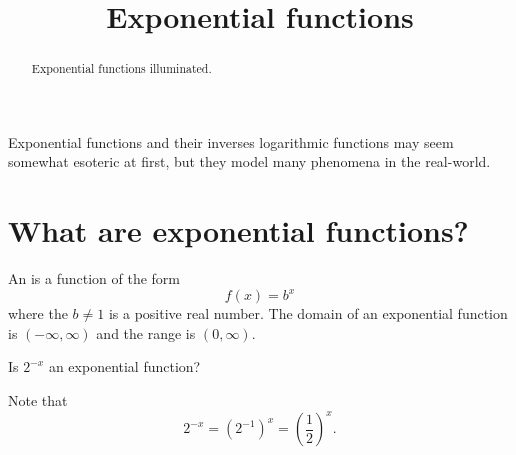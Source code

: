 \documentclass{ximera}
\title{Exponential functions}
\begin{document}
\begin{abstract}
  Exponential functions illuminated.
\end{abstract}
\maketitle

Exponential functions and their inverses logarithmic functions may seem somewhat esoteric at
first, but they model many phenomena in the real-world.




\section{What are exponential functions?}


\begin{definition}
  An  is a function of the form
  \[
  f(x) = b^x
  \]
  where the  $b\ne 1$ is a positive real number. The domain of an
  exponential function is $(-\infty,\infty)$ and the range is $(0, \infty)$.
\end{definition}

\begin{question}
  Is $2^{-x}$ an exponential function?
  \begin{multipleChoice}
  \end{multipleChoice}
  \begin{feedback}
    Note that
    \[
    2^{-x} = \left(2^{-1}\right)^x = \left(\frac{1}{2}\right)^x.
    \]
  \end{feedback}
\end{question}


%
%
%
%   
\end{document}

